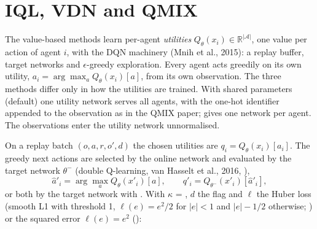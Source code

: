 \section{IQL, VDN and QMIX}\label{sec:marl-value}

The value-based methods learn per-agent \emph{utilities}
$Q_\theta(x_i) \in \mathbb{R}^{|\mathcal{A}|}$, one value per action of agent
$i$, with the DQN machinery (Mnih et al., 2015): a replay buffer, target
networks and $\epsilon$-greedy exploration. Every agent acts greedily on its
own utility, $a_i = \arg\max_a Q_\theta(x_i)[a]$, from its own observation. The
three methods differ only in how the utilities are trained. With shared
parameters (default) one utility network serves all agents, with the one-hot
identifier appended to the observation as in the QMIX paper;
 gives one network per agent. The observations
enter the utility network unnormalised.

On a replay batch $(o, a, r, o', d)$ the chosen utilities are
$q_i = Q_\theta(x_i)[a_i]$. The greedy next actions are selected by the online
network and evaluated by the target network $\theta^-$ (double Q-learning, van
Hasselt et al., 2016, ),
\begin{equation}
  \hat a'_i = \arg\max_a Q_\theta(x'_i)[a], \qquad
  q'_i = Q_{\theta^-}(x'_i)[\hat a'_i],
\end{equation}
or both by the target network with . With $\kappa$ =
, $d$ the  flag and $\ell$ the Huber loss
(smooth L1 with threshold 1, $\ell(e) = e^2/2$ for $|e| < 1$ and $|e| - 1/2$
otherwise; ) or the squared error $\ell(e) = e^2$
():

